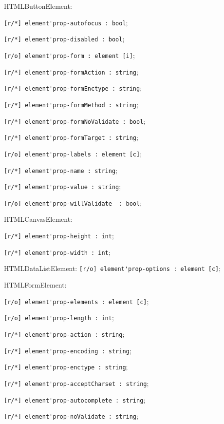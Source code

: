 \begin{icItems}
	\item HTMLButtonElement:
	\begin{icItems}
		\item \lstinline|[r/*] element'prop-autofocus : bool|;
		\item \lstinline|[r/*] element'prop-disabled : bool|;
		\item \lstinline|[r/o] element'prop-form : element [i]|;
		\item \lstinline|[r/*] element'prop-formAction : string|;
		\item \lstinline|[r/*] element'prop-formEnctype : string|;
		\item \lstinline|[r/*] element'prop-formMethod : string|;
		\item \lstinline|[r/*] element'prop-formNoValidate : bool|;
		\item \lstinline|[r/*] element'prop-formTarget : string|;
		\item \lstinline|[r/o] element'prop-labels : element [c]|;
		\item \lstinline|[r/*] element'prop-name : string|;
		\item \lstinline|[r/*] element'prop-value : string|;
		\item \lstinline|[r/o] element'prop-willValidate  : bool|;
	\end{icItems}
	
	\item HTMLCanvasElement:
	\begin{icItems}
		\item \lstinline|[r/*] element'prop-height : int|;
		\item \lstinline|[r/*] element'prop-width : int|;
	\end{icItems}
	
	\item HTMLDataListElement: \lstinline|[r/o] element'prop-options : element [c]|;
	
	\item HTMLFormElement:
	\begin{icItems}
		\item \lstinline|[r/o] element'prop-elements : element [c]|;
		\item \lstinline|[r/o] element'prop-length : int|;
		\item \lstinline|[r/*] element'prop-action : string|;
		\item \lstinline|[r/*] element'prop-encoding : string|;
		\item \lstinline|[r/*] element'prop-enctype : string|;
		\item \lstinline|[r/*] element'prop-acceptCharset : string|;
		\item \lstinline|[r/*] element'prop-autocomplete : string|;
		\item \lstinline|[r/*] element'prop-noValidate : string|;
	\end{icItems}
	

\end{icItems}
